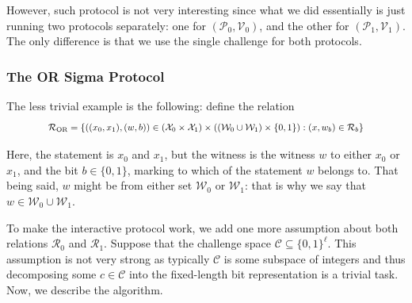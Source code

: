 \documentclass[../../book.tex]{subfiles}
\begin{document}
However, such protocol is not very interesting since what we did essentially is just running two protocols separately: one for $(\mathcal{P}_0,\mathcal{V}_0)$, and the other for $(\mathcal{P}_1,\mathcal{V}_1)$. The only difference is that we use the single challenge for both protocols.

\subsubsection{The OR Sigma Protocol}

The less trivial example is the following: define the relation
\begin{equation*}
    \scalebox{0.85}{$
    \mathcal{R}_{\text{OR}} = \left\{ ((x_0, x_1), (w, b)) \in (\mathcal{X}_0 \times \mathcal{X}_1) \times ((\mathcal{W}_0 \cup \mathcal{W}_1) \times \{0,1\}): (x, w_b) \in \mathcal{R}_b \right\}
    $}
\end{equation*}

Here, the statement is $x_0$ and $x_1$, but the witness is the witness $w$ to either $x_0$ or $x_1$, and the bit $b \in \{0,1\}$, marking to which of the statement $w$ belongs to. That being said, $w$ might be from either set $\mathcal{W}_0$ or $\mathcal{W}_1$: that is why we say that $w \in \mathcal{W}_0 \cup \mathcal{W}_1$.

To make the interactive protocol work, we add one more assumption about both relations $\mathcal{R}_0$ and $\mathcal{R}_1$. Suppose that the challenge space $\mathcal{C} \subseteq \{0,1\}^{\ell}$. This assumption is not very strong as typically $\mathcal{C}$ is some subspace of integers and thus decomposing some $c \in \mathcal{C}$ into the fixed-length bit representation is a trivial task.
Now, we describe the algorithm.

\vspace{-2mm}
\end{document}
